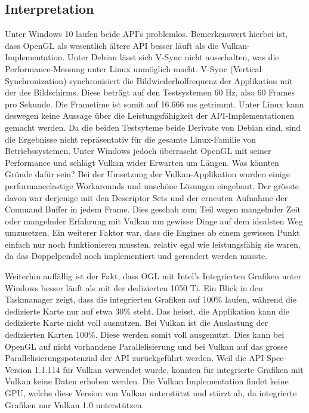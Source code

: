 \documentclass[titlepage, 11pt, a4paper, ngerman]{article}
\begin{document}
\subsection{Interpretation}
Unter Windows 10 laufen beide \acrshort{API}'s problemlos. Bemerkenswert hierbei ist, dass \acrshort{OpenGL} als wesentlich ältere \acrshort{API} besser läuft als die Vulkan-Implementation. Unter Debian lässt sich V-Sync nicht ausschalten, was die Performance-Messung unter \gls{Linux} unmöglich macht. V-Sync (Vertical Synchronization) synchronisiert die Bildwiederholfrequenz der Applikation mit der des Bildschirms. Diese beträgt auf den Testsystemen 60 Hz, also 60 \glspl{Frame} pro Sekunde. Die \gls{Frametime} ist somit auf 16.666 ms getrimmt. Unter \gls{Linux} kann deswegen keine Aussage über die Leistungsfähigkeit der \acrshort{API}-Implementationen gemacht werden. Da die beiden Testsyteme beide Derivate von Debian sind, sind die Ergebnisse nicht repräsentativ für die gesamte Linux-Familie von Betriebssystemen. Unter Windows jedoch überrascht \acrshort{OpenGL} mit seiner Performance und schlägt Vulkan wider Erwarten um Längen. Was könnten Gründe dafür sein? Bei der Umsetzung der Vulkan-Applikation wurden einige performancelastige Workarounds und unschöne Lösungen eingebaut. Der grösste davon war derjenige mit den Descriptor Sets und der erneuten Aufnahme der Command Buffer in jedem \gls{Frame}. Dies geschah zum Teil wegen mangelnder Zeit oder mangelnder Erfahrung mit Vulkan um gewisse Dinge auf dem idealsten Weg umzusetzen. Ein weiterer Faktor war, dass die \glspl{Engine} ab einem gewissen Punkt einfach nur noch funktionieren mussten, relativ egal wie leistungsfähig sie waren, da das Doppelpendel noch implementiert und gerendert werden musste.\par
Weiterhin auffällig ist der Fakt, dass OGL mit Intel's Integrierten Grafiken unter Windows besser läuft als mit der dedizierten 1050 Ti. Ein Blick in den Taskmanager zeigt, dass die integrierten Grafiken auf 100\% laufen, während die dedizierte Karte nur auf etwa 30\% steht. Das heisst, die Applikation kann die dedizierte Karte nicht voll ausnutzen. Bei Vulkan ist die Auslastung der dedizierten Karten 100\%. Diese werden somit voll ausgenutzt. Dies kann bei OpenGL auf nicht vorhandene Parallelisierung und bei Vulkan auf das grosse Parallelisierungspotenzial der \acrshort{API} zurückgeführt werden. Weil die \acrshort{API} Spec-Version 1.1.114 für Vulkan verwendet wurde, konnten für integrierte Grafiken mit Vulkan keine Daten erhoben werden. Die Vulkan Implementation findet keine GPU, welche diese Version von Vulkan unterstützt und stürzt ab, da integrierte Grafiken nur Vulkan 1.0 unterstützen.
\end{document}

